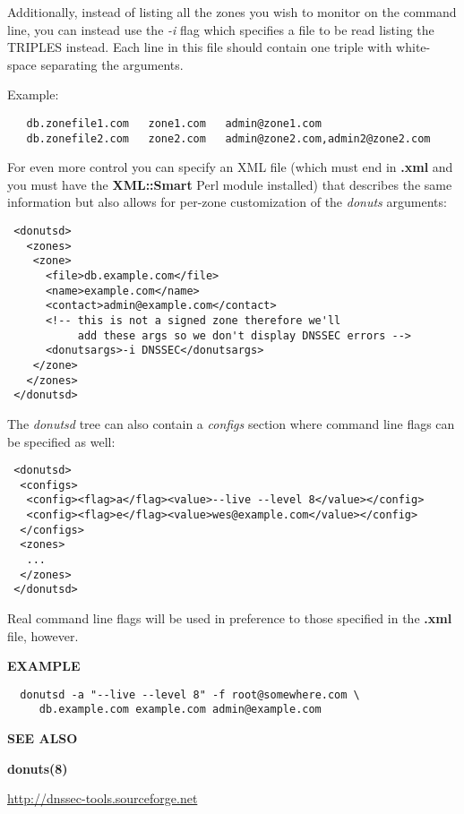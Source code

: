Additionally, instead of listing all the zones you wish to monitor on
the command line, you can instead use the {\it -i} flag which specifies a
file to be read listing the TRIPLES instead.  Each line in this file
should contain one triple with white-space separating the arguments.

Example:

\begin{verbatim}
   db.zonefile1.com   zone1.com   admin@zone1.com
   db.zonefile2.com   zone2.com   admin@zone2.com,admin2@zone2.com
\end{verbatim}

For even more control you can specify an XML file (which must end in
{\bf .xml} and you must have the {\bf XML::Smart} Perl module installed) that
describes the same information but also allows for per-zone
customization of the {\it donuts} arguments:

\begin{verbatim}
 <donutsd>
   <zones>
    <zone>
      <file>db.example.com</file>
      <name>example.com</name>
      <contact>admin@example.com</contact>
      <!-- this is not a signed zone therefore we'll
           add these args so we don't display DNSSEC errors -->
      <donutsargs>-i DNSSEC</donutsargs>
    </zone>
   </zones>
 </donutsd>
\end{verbatim}

The {\it donutsd} tree can also contain a {\it configs} section where command
line flags can be specified as well:

\begin{verbatim}
 <donutsd>
  <configs>
   <config><flag>a</flag><value>--live --level 8</value></config>
   <config><flag>e</flag><value>wes@example.com</value></config>
  </configs>
  <zones>
   ...
  </zones>
 </donutsd>
\end{verbatim}

Real command line flags will be used in preference to those specified
in the {\bf .xml} file, however.

{\bf EXAMPLE}

\begin{verbatim}
  donutsd -a "--live --level 8" -f root@somewhere.com \
     db.example.com example.com admin@example.com
\end{verbatim}

{\bf SEE ALSO}

{\bf donuts(8)}

\url{http://dnssec-tools.sourceforge.net}

